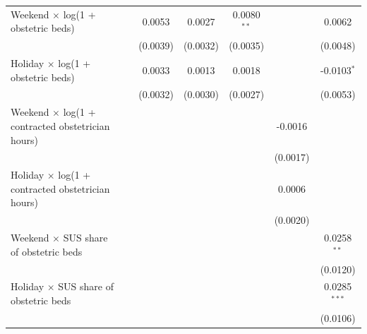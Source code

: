 \begin{table}
{\begin{tabular}{lcccccc}
\addlinespace[2pt]
      Weekend $\times$ log(1 + obstetric beds)                          &                         & 0.0053             & 0.0027     & 0.0080$^{**}$    &                  & 0.0062\\   
                                                                        &                         & (0.0039)           & (0.0032)   & (0.0035)         &                  & (0.0048)\\   
\addlinespace[2pt]
      Holiday $\times$ log(1 + obstetric beds)                 &                         & 0.0033             & 0.0013     & 0.0018           &                  & -0.0103$^{*}$\\   
                                                                        &                         & (0.0032)           & (0.0030)   & (0.0027)         &                  & (0.0053)\\   
\addlinespace[2pt]
      Weekend $\times$ log(1 + contracted obstetrician hours)           &                         &                    &            &                  & -0.0016          &   \\   
                                                                        &                         &                    &            &                  & (0.0017)         &   \\   
\addlinespace[2pt]
      Holiday $\times$ log(1 + contracted obstetrician hours)  &                         &                    &            &                  & 0.0006           &   \\   
                                                                        &                         &                    &            &                  & (0.0020)         &   \\   
\addlinespace[2pt]
      Weekend $\times$ SUS share of obstetric beds                      &                         &                    &            &                  &                  & 0.0258$^{**}$\\   
                                                                        &                         &                    &            &                  &                  & (0.0120)\\   
\addlinespace[2pt]
      Holiday $\times$ SUS share of obstetric beds             &                         &                    &            &                  &                  & 0.0285$^{***}$\\   
                                                                        &                         &                    &            &                  &                  & (0.0106)\\   

\end{tabular}}
\end{table}
